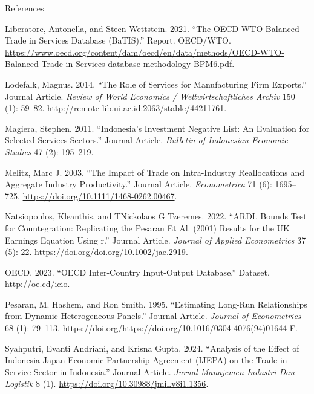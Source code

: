 \documentclass[
  ignorenonframetext,
]{beamer}
\newlength{\cslhangindent}
\newenvironment{CSLReferences}[2] %
 {\begin{list}{}{%
  \setlength{\itemindent}{0pt}
  \setlength{\leftmargin}{0pt}
  \setlength{\parsep}{0pt}
  \ifodd #1
   \setlength{\leftmargin}{\cslhangindent}
   \setlength{\itemindent}{-1\cslhangindent}
  \fi
  \setlength{\itemsep}{#2\baselineskip}}}
 {\end{list}}
\begin{document}
\begin{frame}[s]{References}
\begin{CSLReferences}{1}{0}
Liberatore, Antonella, and Steen Wettstein. 2021. {``The OECD-WTO
Balanced Trade in Services Database (BaTIS).''} Report. OECD/WTO.
\url{https://www.oecd.org/content/dam/oecd/en/data/methods/OECD-WTO-Balanced-Trade-in-Services-database-methodology-BPM6.pdf}.

Lodefalk, Magnus. 2014. {``The Role of Services for Manufacturing Firm
Exports.''} Journal Article. \emph{Review of World Economics /
Weltwirtschaftliches Archiv} 150 (1): 59--82.
\url{http://remote-lib.ui.ac.id:2063/stable/44211761}.

Magiera, Stephen. 2011. {``Indonesia's Investment Negative List: An
Evaluation for Selected Services Sectors.''} Journal Article.
\emph{Bulletin of Indonesian Economic Studies} 47 (2): 195--219.

Melitz, Marc J. 2003. {``The Impact of Trade on Intra-Industry
Reallocations and Aggregate Industry Productivity.''} Journal Article.
\emph{Econometrica} 71 (6): 1695--725.
\url{https://doi.org/10.1111/1468-0262.00467}.

Natsiopoulos, Kleanthis, and TNickolaos G Tzeremes. 2022. {``ARDL Bounds
Test for Countegration: Replicating the Pesaran Et Al. (2001) Results
for the UK Earnings Equation Using r.''} Journal Article. \emph{Journal
of Applied Econometrics} 37 (5): 22.
\url{https://doi.org/doi.org/10.1002/jae.2919}.

OECD. 2023. {``OECD Inter-Country Input-Output Database.''} Dataset.
\url{http://oe.cd/icio}.

Pesaran, M. Hashem, and Ron Smith. 1995. {``Estimating Long-Run
Relationships from Dynamic Heterogeneous Panels.''} Journal Article.
\emph{Journal of Econometrics} 68 (1): 79--113.
https://doi.org/\url{https://doi.org/10.1016/0304-4076(94)01644-F}.

Syahputri, Evanti Andriani, and Krisna Gupta. 2024. {``Analysis of the
Effect of Indonesia-Japan Economic Partnership Agreement (IJEPA) on the
Trade in Service Sector in Indonesia.''} Journal Article. \emph{Jurnal
Manajemen Industri Dan Logistik} 8 (1).
\url{https://doi.org/10.30988/jmil.v8i1.1356}.

\end{CSLReferences}
\end{frame}
\end{document}
